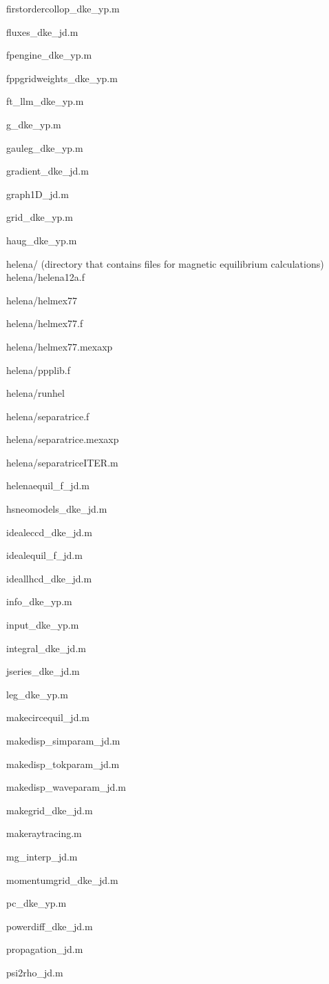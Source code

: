\begin{itemize}
firstordercollop\_dke\_yp.m

fluxes\_dke\_jd.m

fpengine\_dke\_yp.m

fppgridweights\_dke\_yp.m

ft\_llm\_dke\_yp.m

g\_dke\_yp.m

gauleg\_dke\_yp.m

gradient\_dke\_jd.m

graph1D\_jd.m

grid\_dke\_yp.m

haug\_dke\_yp.m

helena/ (directory that contains files for magnetic equilibrium calculations)
helena/helena12a.f

helena/helmex77

helena/helmex77.f

helena/helmex77.mexaxp

helena/ppplib.f

helena/runhel

helena/separatrice.f

helena/separatrice.mexaxp

helena/separatriceITER.m

helenaequil\_f\_jd.m

hsneomodels\_dke\_jd.m

idealeccd\_dke\_jd.m

idealequil\_f\_jd.m

ideallhcd\_dke\_jd.m

info\_dke\_yp.m

input\_dke\_yp.m

integral\_dke\_jd.m

jseries\_dke\_jd.m

leg\_dke\_yp.m

makecircequil\_jd.m

makedisp\_simparam\_jd.m

makedisp\_tokparam\_jd.m

makedisp\_waveparam\_jd.m

makegrid\_dke\_jd.m

makeraytracing.m

mg\_interp\_jd.m

momentumgrid\_dke\_jd.m

pc\_dke\_yp.m

powerdiff\_dke\_jd.m

propagation\_jd.m

psi2rho\_jd.m


\end{itemize}
